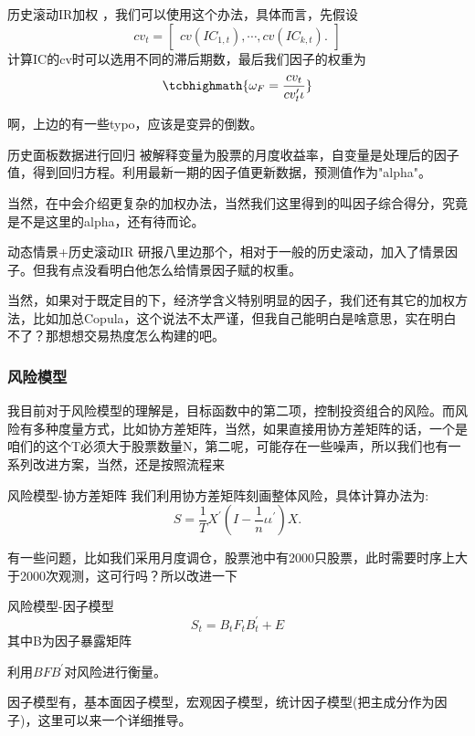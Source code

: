 \documentclass[12pt]{article}
\theoremstyle{definition}
\begin{document}
\begin{sdefinition}{历史滚动IR加权}{}
，我们可以使用这个办法，具体而言，先假设
$$
cv_t = \begin{bmatrix}
	cv(IC_{1,t}),\cdots,cv(IC_{k,t}).
\end{bmatrix}
$$
计算IC的cv时可以选用不同的滞后期数，最后我们因子的权重为
$$
\tcbhighmath{\omega_F = \frac{cv_t}{cv_t^\prime \iota}}
$$
\end{sdefinition}
啊，上边的有一些typo，应该是变异的倒数。
\begin{sdefinition}{历史面板数据进行回归}{}
被解释变量为股票的月度收益率，自变量是处理后的因子值，得到回归方程。利用最新一期的因子值更新数据，预测值作为"alpha"。
\end{sdefinition}


当然，在中会介绍更复杂的加权办法，当然我们这里得到的叫因子综合得分，究竟是不是这里的alpha，还有待而论。

\begin{sdefinition}{动态情景+历史滚动IR}{}
	研报八里边那个，相对于一般的历史滚动，加入了情景因子。但我有点没看明白他怎么给情景因子赋的权重。
\end{sdefinition}

\begin{sremark}{}{}
当然，如果对于既定目的下，经济学含义特别明显的因子，我们还有其它的加权方法，比如加总Copula，这个说法不太严谨，但我自己能明白是啥意思，实在明白不了？那想想交易热度怎么构建的吧。
\end{sremark}

\subsubsection{风险模型}
我目前对于风险模型的理解是，目标函数中的第二项，控制投资组合的风险。而风险有多种度量方式，比如协方差矩阵，当然，如果直接用协方差矩阵的话，一个是咱们的这个T必须大于股票数量N，第二呢，可能存在一些噪声，所以我们也有一系列改进方案，当然，还是按照流程来
\begin{sdefinition}{风险模型-协方差矩阵}{}
	我们利用协方差矩阵刻画整体风险，具体计算办法为:
$$
S = \frac{1}{T}X^\prime(I-\frac{1}{n}\iota \iota^\prime)X.
$$
\end{sdefinition}
\begin{sremark}{}{}
	有一些问题，比如我们采用月度调仓，股票池中有2000只股票，此时需要时序上大于2000次观测，这可行吗？所以改进一下
\end{sremark}

\begin{sdefinition}{风险模型-因子模型}{}
$$
S_t = B_tF_tB_t^\prime + E 
$$
其中B为因子暴露矩阵
\end{sdefinition}
利用$BFB^\prime$对风险进行衡量。
\begin{sremark}{}{}
因子模型有，基本面因子模型，宏观因子模型，统计因子模型(把主成分作为因子)，这里可以来一个详细推导。
\end{sremark}
\end{document}
